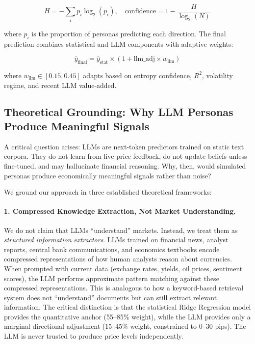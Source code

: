 \documentclass[11pt]{article}
\begin{document}
\begin{equation}
H = -\sum_{i} p_i \log_2(p_i), \quad \text{confidence} = 1 - \frac{H}{\log_2(N)}
\end{equation}

where $p_i$ is the proportion of personas predicting each direction. The final prediction combines statistical and LLM components with adaptive weights:

\begin{equation}
\hat{y}_\text{final} = \hat{y}_\text{stat} \times (1 + \text{llm\_adj} \times w_\text{llm})
\end{equation}

where $w_\text{llm} \in [0.15, 0.45]$ adapts based on entropy confidence, $R^2$, volatility regime, and recent LLM value-added.

\subsection{Theoretical Grounding: Why LLM Personas Produce Meaningful Signals}
\label{sec:theoretical}

A critical question arises: LLMs are next-token predictors trained on static text corpora. They do not learn from live price feedback, do not update beliefs unless fine-tuned, and may hallucinate financial reasoning. Why, then, would simulated personas produce economically meaningful signals rather than noise?

We ground our approach in three established theoretical frameworks:

\paragraph{1. Compressed Knowledge Extraction, Not Market Understanding.}
We do not claim that LLMs ``understand'' markets. Instead, we treat them as \textit{structured information extractors}. LLMs trained on financial news, analyst reports, central bank communications, and economics textbooks encode compressed representations of how human analysts reason about currencies. When prompted with current data (exchange rates, yields, oil prices, sentiment scores), the LLM performs approximate pattern matching against these compressed representations. This is analogous to how a keyword-based retrieval system does not ``understand'' documents but can still extract relevant information. The critical distinction is that the statistical Ridge Regression model provides the quantitative anchor (55--85\% weight), while the LLM provides only a marginal directional adjustment (15--45\% weight, constrained to 0--30 pips). The LLM is never trusted to produce price levels independently.
\end{document}
